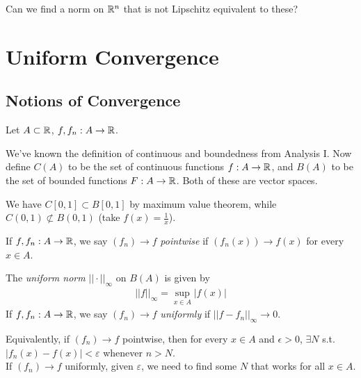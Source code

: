 \documentclass[a4paper]{article}
\begin{document}
\begin{prob}
Can we find a norm on $\mathbb{R}^n$ that is not Lipschitz equivalent to these?
\end{prob}

\newpage

\section{Uniform Convergence}

\subsection{Notions of Convergence}

Let $A \subset \mathbb{R}$, $f,f_n: A \to \mathbb{R}$.

We've known the definition of continuous and boundedness from Analysis I. Now define $C\left(A\right)$ to be the set of continuous functions $f:A \to \mathbb{R}$, and $B\left(A\right)$ to be the set of bounded functions $F:A \to \mathbb{R}$. Both of these are vector spaces.

We have $C\left[0,1\right] \subset B\left[0,1\right]$ by maximum value theorem, while $C\left(0,1\right) \not\subset B\left(0,1\right)$ (take $f\left(x\right) = \frac{1}{x}$).

\begin{defi}
If $f,f_n : A \to \mathbb{R}$, we say $\left(f_n\right) \to f$ \emph{pointwise} if $\left(f_n\left(x\right)\right) \to f\left(x\right)$ for every $x\in A$.
\end{defi}

\begin{defi}
The \emph{uniform norm} $||\cdot||_\infty$ on $B\left(A\right)$ is given by
\begin{equation*}
\begin{aligned}
||f||_\infty = \sup_{x \in A} \left|f\left(x\right)\right|
\end{aligned}
\end{equation*}
If $f,f_n:A \to \mathbb{R}$, we say $\left(f_n\right) \to f$ \emph{uniformly} if $||f-f_n||_\infty \to 0$.

Equivalently, if $\left(f_n\right) \to f$ pointwise, then for every $x \in A$ and $\epsilon >0$, $\exists N$ s.t. $\left|f_n\left(x\right) - f\left(x\right)\right| < \varepsilon$ whenever $n>N$.\\
If $\left(f_n\right) \to f$ uniformly, given $\varepsilon$, we need to find some $N$ that works for all $x \in A$.
\end{defi}
\end{document}

